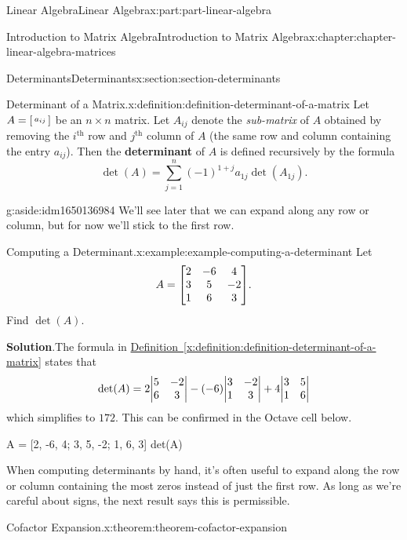 \documentclass[twoside,10pt,]{book}
\newcommand{\blocktitlefont}{\relax}
\newcommand{\xreffont}{\relax}
\newcommand{\terminology}[1]{\textbf{#1}}
\numberwithin{equation}{part}
\renewcommand{\th}{\text{th}}
\begin{document}
\begin{partptx}{Linear Algebra}{}{Linear Algebra}{}{}{x:part:part-linear-algebra}
\begin{chapterptx}{Introduction to Matrix Algebra}{}{Introduction to Matrix Algebra}{}{}{x:chapter:chapter-linear-algebra-matrices}
\begin{sectionptx}{Determinants}{}{Determinants}{}{}{x:section:section-determinants}
\begin{definition}{Determinant of a Matrix.}{x:definition:definition-determinant-of-a-matrix}%
%
Let \(A = \smqty[a_{ij}]\) be an \(n\times n\) matrix. Let \(A_{ij}\) denote the \emph{sub-matrix} of \(A\) obtained by removing the \(i^\th\) row and \(j^\th\) column of \(A\) (the same row and column containing the entry \(a_{ij}\)). Then the \terminology{determinant} of \(A\) is defined recursively by the formula%
\begin{equation*}
\det(A) = \sum_{j=1}^{n}(-1)^{1+j}a_{1j}\det(A_{1j}).
\end{equation*}
\begin{aside}{}{g:aside:idm1650136984}%
We'll see later that we can expand along any row or column, but for now we'll stick to the first row.%
\end{aside}
%
\end{definition}
\begin{example}{Computing a Determinant.}{x:example:example-computing-a-determinant}%
Let%
\begin{equation*}
A = \mqty[2 & -6 & 4 \\ 3 & 5 & -2 \\ 1 & 6 & 3].
\end{equation*}
Find \(\det(A)\).%
\par\smallskip%
\noindent\textbf{\blocktitlefont Solution}.\hypertarget{g:solution:idm1650128664}{}\quad{}The formula in \hyperref[x:definition:definition-determinant-of-a-matrix]{Definition~{\xreffont\ref{x:definition:definition-determinant-of-a-matrix}}} states that%
\begin{equation*}
\det(A) = 2\mqty|5 & -2 \\ 6 & 3| - (-6)\mqty|3 & -2 \\ 1 & 3| + 4\mqty|3 & 5 \\ 1 & 6|
\end{equation*}
which simplifies to \(172\). This can be confirmed in the Octave cell below.%
\end{example}
\begin{sageinput}
A = [2, -6, 4; 3, 5, -2; 1, 6, 3]
det(A)
\end{sageinput}
When computing determinants by hand, it's often useful to expand along the row or column containing the most zeros instead of just the first row. As long as we're careful about signs, the next result says this is permissible.%
\begin{theorem}{Cofactor Expansion.}{}{x:theorem:theorem-cofactor-expansion}%
%

\end{theorem}
\end{sectionptx}
\end{chapterptx}
\end{partptx}
\end{document}
